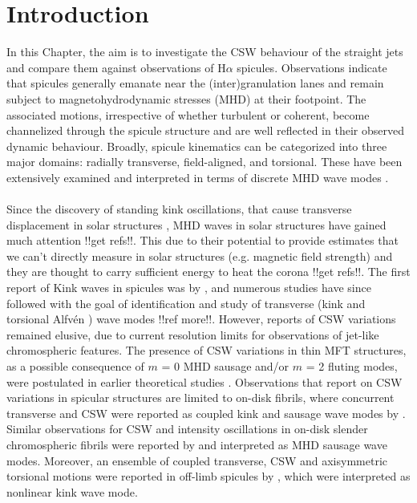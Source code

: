 \documentclass[12pt]{ociamthesis}
\newcommand{\Alfven}{Alfv\'{e}n }
\newcommand{\np}{\\ \\}
\begin{document}
\section{Introduction}
In this Chapter, the aim is to investigate the CSW behaviour of the straight jets and compare them against observations of H$\alpha$ spicules. Observations indicate that spicules generally emanate near the (inter)granulation lanes and remain subject to magnetohydrodynamic stresses (MHD) at their footpoint. The associated motions, irrespective of whether turbulent or coherent, become channelized through the spicule structure and are well reflected in their observed dynamic behaviour. Broadly, spicule kinematics can be categorized into three major domains: radially transverse, field-aligned, and torsional. These have been extensively examined and interpreted in terms of discrete MHD wave modes \citep[see review:][]{Zaqarashvili2009}. \np  
%
Since the discovery of standing kink oscillations, that cause transverse displacement in solar structures \citep{Aschwanden1999ApJ520880A, Nakariakov1999Sci285862N, Aschwanden2002SoPh20699A}, MHD waves in solar structures have gained much attention \citep[][\textit{e.g.}]{} {\color{green} !!get refs!!}. This due to their potential to provide estimates that we can't directly measure in solar structures (e.g. magnetic field strength) and they are thought to carry sufficient energy to heat the corona {\color{green} !!get refs!!}. The first report of Kink waves in spicules was by \cite{Kukhianidze2006}, and numerous studies have since followed with the goal of identification and study of transverse (kink and torsional \Alfven) wave modes \citep{DePontieu2007, Ebadi2014, Sharma2017} {\color{green} !!ref more!!}. However, reports of CSW variations remained elusive, due to current resolution limits for observations of jet-like chromospheric features. The presence of CSW variations in thin MFT structures, as a possible consequence of $m$ = 0 MHD sausage and/or $m$ = 2 fluting modes, were postulated in earlier theoretical studies \citep{Ziegler1997a, Ziegler1997, Ruderman2010}. Observations that report on CSW variations in spicular structures are limited to on-disk fibrils, where concurrent transverse and CSW were reported as coupled kink and sausage wave modes by \citet{Jess2012, Morton2012}. Similar observations for CSW and intensity oscillations in on-disk slender chromospheric fibrils were reported by \citet{Gafeira2017} and interpreted as MHD sausage wave modes. Moreover, an ensemble of coupled transverse, CSW and axisymmetric torsional motions were reported in off-limb spicules by \citet{Sharma2018}, which were interpreted as nonlinear kink wave mode. \np
\end{document}
